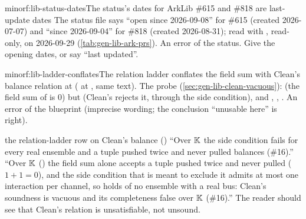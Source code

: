 \begin{finding}{minor}{f:lib-status-dates}{The status's dates for ArkLib \#615 and \#818 are last-update dates}
 The status file says \enquote{open since 2026-09-08} for \#615 (created
2026-07-07) and \enquote{since 2026-09-04} for \#818 (created 2026-08-31); read with ,
read-only, on 2026-09-29 (\cref{tab:gen-lib-ark-prs}).
 An error of the status.
 Give the opening dates, or say \enquote{last updated}.
\end{finding}

\begin{finding}{minor}{f:lib-ladder-conflates}{The relation ladder conflates the field sum with Clean's balance relation}
  at  ( at
, same text). The probe  (\cref{sec:gen-lib-clean-vacuous}):
 (the field sum of  is $0$) but
 (Clean's  rejects it, through the side
condition), and , ,
\allowbreak{}\allowbreak{}\allowbreak{}\allowbreak{}.
 An error of the blueprint (imprecise wording; the conclusion
\enquote{unusable here} is right).
\begin{change}{the relation-ladder row on Clean's balance ()}
\asis \enquote{Over $\mathbb{K}$ the side condition fails for every real ensemble and a tuple pushed twice
and never pulled balances (\#16).}
\asproposed \enquote{Over $\mathbb{K}$ () the field sum alone accepts a tuple pushed
twice and never pulled ($1 + 1 = 0$), and the side condition  that is
meant to exclude it admits at most one interaction per channel, so  holds
of no ensemble with a real bus: Clean's soundness is vacuous and its completeness false over $\mathbb{K}$
(\#16).}
\reason The reader should see that Clean's relation is unsatisfiable, not unsound.
\end{change}
\end{finding}

